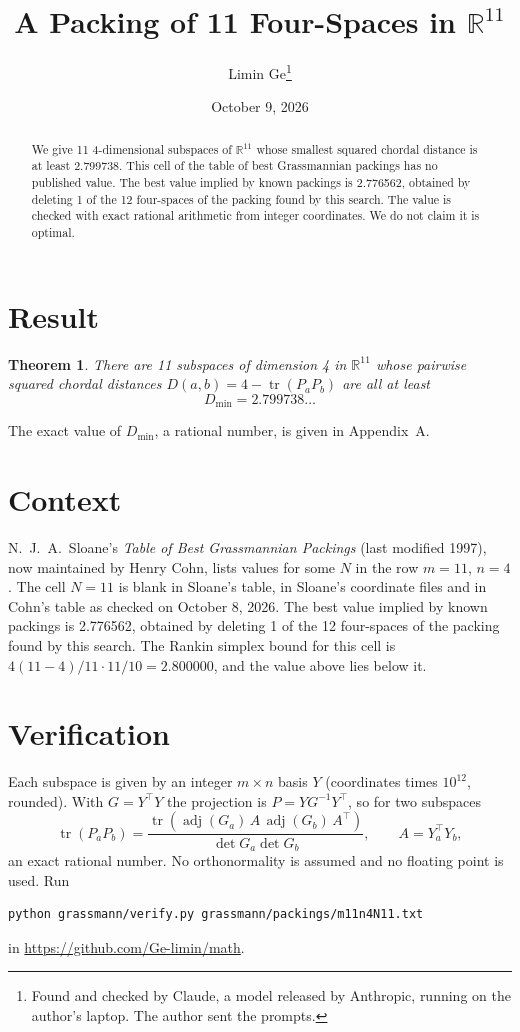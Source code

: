 \documentclass[11pt,a4paper]{article}
\title{A Packing of 11 Four-Spaces in $\mathbb{R}^{11}$}
\author{Limin Ge\thanks{Found and checked by Claude, a model released by Anthropic, running on the author's laptop. The author sent the prompts.}}
\date{October 9, 2026}
\newtheorem*{theorem}{Theorem}
\begin{document}
\maketitle
\begin{abstract}
We give 11 4-dimensional subspaces of $\mathbb{R}^{11}$ whose smallest squared chordal distance is at least 2.799738. This cell of the table of best Grassmannian packings has no published value. The best value implied by known packings is 2.776562, obtained by deleting 1 of the 12 four-spaces of the packing found by this search. The value is checked with exact rational arithmetic from integer coordinates. We do not claim it is optimal.
\end{abstract}

\section{Result}
\begin{theorem}
There are 11 subspaces of dimension 4 in $\mathbb{R}^{11}$ whose pairwise squared chordal distances $D(a,b) = 4 - \operatorname{tr}(P_aP_b)$ are all at least
\[ D_{\min} = 2.799738\ldots \]
\end{theorem}
The exact value of $D_{\min}$, a rational number, is given in Appendix~A.


\section{Context}
N.~J.~A.~Sloane's \emph{Table of Best Grassmannian Packings} (last modified 1997), now maintained by Henry Cohn, lists values for some $N$ in the row $m=11$, $n=4$. The cell $N=11$ is blank in Sloane's table, in Sloane's coordinate files and in Cohn's table as checked on October 8, 2026. The best value implied by known packings is 2.776562, obtained by deleting 1 of the 12 four-spaces of the packing found by this search. The Rankin simplex bound for this cell is $4(11-4)/11\cdot 11/10 = 2.800000$, and the value above lies below it.


\section{Verification}
Each subspace is given by an integer $m\times n$ basis $Y$ (coordinates times $10^{12}$, rounded). With $G=Y^\top Y$ the projection is $P=YG^{-1}Y^\top$, so for two subspaces
\[ \operatorname{tr}(P_aP_b)=\frac{\operatorname{tr}(\operatorname{adj}(G_a)\,A\,\operatorname{adj}(G_b)\,A^\top)}{\det G_a\det G_b},\qquad A=Y_a^\top Y_b, \]
an exact rational number. No orthonormality is assumed and no floating point is used. Run
\begin{verbatim}
python grassmann/verify.py grassmann/packings/m11n4N11.txt
\end{verbatim}
in \url{https://github.com/Ge-limin/math}.
\end{document}
